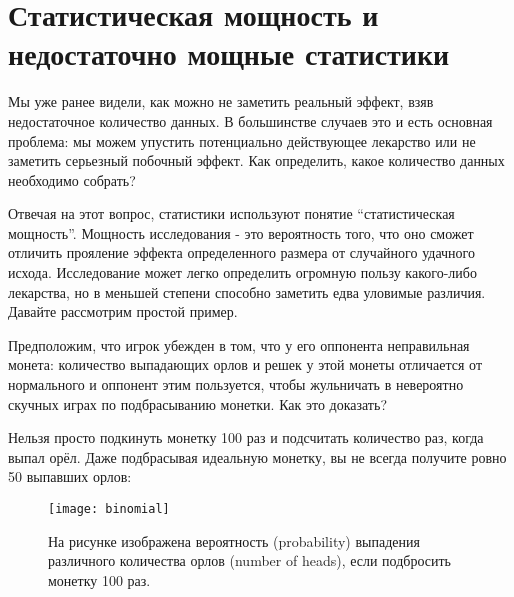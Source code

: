 

\chapter[Статистическая мощность]{Статистическая мощность и недостаточно мощные статистики}
\label{chp3}

Мы уже ранее видели, как можно не заметить реальный эффект, взяв недостаточное количество данных. В большинстве случаев это и есть основная проблема: мы можем упустить потенциально действующее лекарство или не заметить серьезный побочный эффект. Как определить, какое количество данных необходимо собрать? 

Отвечая на этот вопрос, статистики используют понятие ``статистическая мощность''. Мощность исследования - это вероятность того, что оно сможет отличить прояление эффекта определенного размера от случайного удачного исхода. Исследование может легко определить огромную пользу какого-либо лекарства, но в меньшей степени способно заметить едва уловимые различия. Давайте рассмотрим простой пример.

Предположим, что игрок убежден в том, что у его оппонента неправильная монета: количество выпадающих орлов и решек у этой монеты отличается от нормального и оппонент этим пользуется, чтобы жульничать в невероятно скучных играх по подбрасыванию монетки. Как это доказать?

Нельзя просто подкинуть монетку 100 раз и подсчитать количество раз, когда выпал орёл. Даже подбрасывая идеальную монетку, вы не всегда получите ровно 50 выпавших орлов: 


\newpage %

\begin{figure}[h!]
    \centering
    \texttt{[image: binomial]}
    \caption{На рисунке изображена вероятность (probability) выпадения различного количества орлов (number of heads), если подбросить монетку 100 раз.}
    \label{fig3:binominal}
\end{figure}

